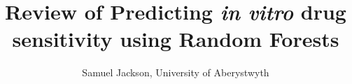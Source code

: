 \documentclass[journal]{IEEEtran}
\begin{document}
%
\title{Review of Predicting \textit{in vitro} drug sensitivity using Random Forests}
%
%
%

\author{Samuel Jackson, University of Aberystwyth}

% 
%



% 




\end{document}
